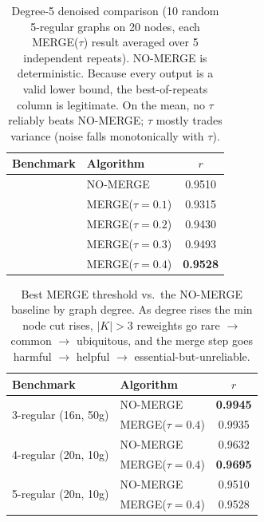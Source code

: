 \begin{table}[t]
\centering
\caption{Degree-5 denoised comparison (10 random 5-regular graphs on 20 nodes,
each MERGE($\tau$) result averaged over 5 independent repeats). NO-MERGE is
deterministic. Because every output is a valid lower bound, the best-of-repeats
column is legitimate. On the mean, no $\tau$ reliably beats NO-MERGE; $\tau$
mostly trades variance (noise falls monotonically with $\tau$).}
\label{tab:merge-deg5}
\begin{tabular}{llc}
\toprule
Benchmark & Algorithm & $r$ \\
\midrule
{}
 & NO-MERGE            & 0.9510 \\
 & MERGE($\tau{=}0.1$) & 0.9315 \\
 & MERGE($\tau{=}0.2$) & 0.9430 \\
 & MERGE($\tau{=}0.3$) & 0.9493 \\
 & MERGE($\tau{=}0.4$) & \textbf{0.9528} \\
\bottomrule
\end{tabular}
\end{table}

\begin{table}[t]
\centering
\caption{Best MERGE threshold vs.\ the NO-MERGE baseline by graph degree.
As degree rises the min node cut rises, $|K|>3$ reweights go rare $\to$ common
$\to$ ubiquitous, and the merge step goes harmful $\to$ helpful $\to$
essential-but-unreliable.}
\label{tab:merge-verdict}
\begin{tabular}{llc}
\toprule
Benchmark & Algorithm & $r$ \\
\midrule
\multirow{2}{*}{3-regular (16n, 50g)}
 & NO-MERGE            & \textbf{0.9945} \\
 & MERGE($\tau{=}0.4$) & 0.9935 \\
\midrule
\multirow{2}{*}{4-regular (20n, 10g)}
 & NO-MERGE            & 0.9632 \\
 & MERGE($\tau{=}0.4$) & \textbf{0.9695} \\
\midrule
\multirow{2}{*}{5-regular (20n, 10g)}
 & NO-MERGE            & 0.9510 \\
 & MERGE($\tau{=}0.4$) & 0.9528 \\
\bottomrule
\end{tabular}
\end{table}
